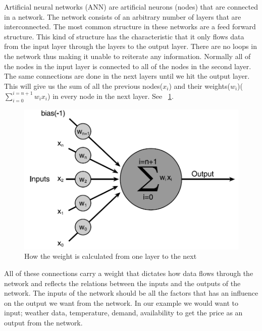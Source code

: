 Artificial neural networks (ANN) are artificial neurons (nodes) that are connected in a network. The network consists of an arbitrary number of layers that are interconnected. The most common structure in these networks are a feed forward structure. This kind of structure has the characteristic that it only flows data from the input layer through the layers to the output layer. There are no loops in the network thus making it unable to reiterate any information. Normally all of the nodes in the input layer is connected to all of the nodes in the second layer. The same connections are done in the next layers until we hit the output layer. This will give us the sum of all the previous nodes(\begin{math}x_i\end{math}) and their weights(\begin{math}w_i\end{math})(\begin{math}\sum_{i=0}^{i=n+1} w_i x_i \end{math}) in every node in the next layer. See ~\ref{fig:weight_of_layers}.
\begin{figure}[h!]
\centering
\includegraphics[width=0.8\linewidth,natwidth=898,natheight=587]{billeder/weight_of_layers.png}
\caption{How the weight is calculated from one layer to the next}
\label{fig:weight_of_layers}
\end{figure}
All of these connections carry a weight that dictates how data flows through the network and reflects the relations between the inputs and the outputs of the network. The inputs of the network should be all the factors that has an influence on the output we want from the network. In our example we would want to input; weather data, temperature, demand, availability \cite{21} to get the price as an output from the network.

